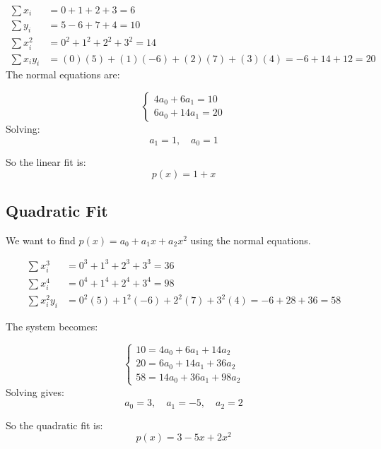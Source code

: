 \documentclass{article}
\begin{document}
\begin{align*}
\sum x_i &= 0 + 1 + 2 + 3 = 6 \\
\sum y_i &= 5 - 6 + 7 + 4 = 10 \\
\sum x_i^2 &= 0^2 + 1^2 + 2^2 + 3^2 = 14 \\
\sum x_i y_i &= (0)(5) + (1)(-6) + (2)(7) + (3)(4) = -6 + 14 + 12 = 20
\end{align*}
%
The normal equations are:

\[
\begin{cases}
4a_0 + 6a_1 = 10 \\
6a_0 + 14a_1 = 20
\end{cases}
\]
%
Solving:
\[
a_1 = 1, \quad a_0 = 1
\]

So the linear fit is:
\[
p(x) = 1 + x
\]

\subsection*{Quadratic Fit}

We want to find \( p(x) = a_0 + a_1 x + a_2 x^2 \) using the normal equations.

\begin{align*}
\sum x_i^3 &= 0^3 + 1^3 + 2^3 + 3^3 = 36 \\
\sum x_i^4 &= 0^4 + 1^4 + 2^4 + 3^4 = 98 \\
\sum x_i^2 y_i &= 0^2(5) + 1^2(-6) + 2^2(7) + 3^2(4) = -6 + 28 + 36 = 58
\end{align*}

The system becomes:

\[
\begin{cases}
10 = 4a_0 + 6a_1 + 14a_2 \\
20 = 6a_0 + 14a_1 + 36a_2 \\
58 = 14a_0 + 36a_1 + 98a_2
\end{cases}
\]
%
Solving gives:
\[
a_0 = 3, \quad a_1 = -5, \quad a_2 = 2
\]

So the quadratic fit is:
\[
p(x) = 3 - 5x + 2x^2
\]
\end{document}
